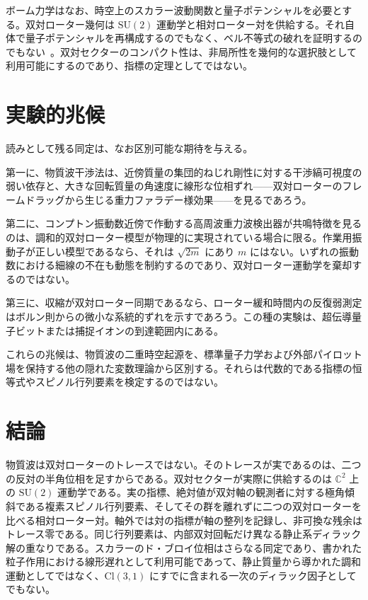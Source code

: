 \documentclass[a4paper]{article}
\begin{document}
ボーム力学はなお、時空上のスカラー波動関数と量子ポテンシャルを必要とする。双対ローター幾何は \(\mathrm{SU}(2)\) 運動学と相対ローター対を供給する。それ自体で量子ポテンシャルを再構成するのでもなく、ベル不等式の破れを証明するのでもない~\cite{bell1964}。双対セクターのコンパクト性は、非局所性を幾何的な選択肢として利用可能にするのであり、指標の定理としてではない。

\section{実験的兆候}

読みとして残る同定は、なお区別可能な期待を与える。

第一に、物質波干渉法は、近傍質量の集団的ねじれ剛性に対する干渉縞可視度の弱い依存と、大きな回転質量の角速度に線形な位相ずれ——双対ローターのフレームドラッグから生じる重力ファラデー様効果——を見るであろう。

第二に、コンプトン振動数近傍で作動する高周波重力波検出器が共鳴特徴を見るのは、調和的双対ローター模型が物理的に実現されている場合に限る。作業用振動子が正しい模型であるなら、それは \(\sqrt{2m}\) にあり \(m\) にはない。いずれの振動数における細線の不在も動態を制約するのであり、双対ローター運動学を棄却するのではない。

第三に、収縮が双対ローター同期であるなら、ローター緩和時間内の反復弱測定はボルン則からの微小な系統的ずれを示すであろう。この種の実験は、超伝導量子ビットまたは捕捉イオンの到達範囲内にある。

これらの兆候は、物質波の二重時空起源を、標準量子力学および外部パイロット場を保持する他の隠れた変数理論から区別する。それらは代数的である指標の恒等式やスピノル行列要素を検定するのではない。

\section{結論}

物質波は双対ローターのトレースではない。そのトレースが実であるのは、二つの反対の半角位相を足すからである。双対セクターが実際に供給するのは \(\mathbb{C}^2\) 上の \(\mathrm{SU}(2)\) 運動学である。実の指標、絶対値が双対軸の観測者に対する極角傾斜である複素スピノル行列要素、そしてその群を離れずに二つの双対ローターを比べる相対ローター対。軸外では対の指標が軸の整列を記録し、非可換な残余はトレース零である。同じ行列要素は、内部双対回転だけ異なる静止系ディラック解の重なりである。スカラーのド・ブロイ位相はさらなる同定であり、書かれた粒子作用における線形遅れとして利用可能であって、静止質量から導かれた調和運動としてではなく、\(\mathrm{Cl}(3,1)\) にすでに含まれる一次のディラック因子としてでもない。
\end{document}
